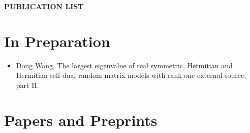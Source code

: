 \documentclass[12pt, letter]{article}
\begin{document}
\renewcommand{\headrulewidth}{0.4pt} 
\renewcommand{\footrulewidth}{0pt} 

\pagestyle{fancy}
\renewcommand{\headheight}{40pt}
\renewcommand{\headrulewidth}{0.4pt} 
\renewcommand{\footrulewidth}{0pt} 


\pagestyle{fancy}
\afterpage{\rhead{\thepage/\pageref{LastPage}}}
\afterpage{\lfoot{}}
\afterpage{\cfoot{}}
\afterpage{\rfoot{}}

\begin{center}
\vspace*{2ex}
{\large \bf PUBLICATION LIST}\\
\vspace*{4ex}
\end{center}

\section*{In Preparation}

\begin{itemize}
\item
  Dong Wang, The largest eigenvalue of real symmetric, Hermitian and Hermitian self-dual random matrix models with rank one external source, part II.
\end{itemize}

\section*{Papers and Preprints}
\end{document}
